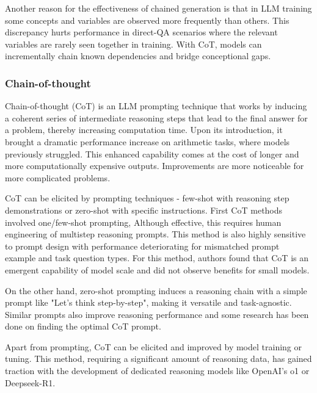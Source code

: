 Another reason for the effectiveness of chained generation is that in LLM training
some concepts and variables are observed more frequently than others\cite{prystawski2023thinkstepstepreasoning}. 
This discrepancy hurts performance in direct-QA scenarios where the relevant
variables are rarely seen together in training. With CoT, models can incrementally chain known dependencies and bridge conceptional gaps.

\subsubsection{Chain-of-thought}\label{sec:cot}
Chain-of-thought\cite{wei2023chainofthoughtpromptingelicitsreasoning} (CoT) is an LLM prompting technique that works by inducing a coherent series of intermediate 
reasoning steps that lead to the final answer for a problem, thereby increasing computation time. 
Upon its introduction, it brought a dramatic performance increase on arithmetic tasks, where models previously struggled.
This enhanced capability comes at the cost of longer and more computationally expensive outputs\cite{brown2024largelanguagemonkeysscaling}. 
Improvements are more noticeable for more complicated problems\cite{wei2023chainofthoughtpromptingelicitsreasoning}. 

CoT can be elicited by prompting techniques - few-shot with reasoning step demonstrations or 
zero-shot with specific instructions\cite{wang2024chainofthoughtreasoningprompting}.
First CoT methods\cite{wei2023chainofthoughtpromptingelicitsreasoning} involved one/few-shot prompting, 
Although effective, this requires human engineering of multistep reasoning prompts.
This method is also highly sensitive to prompt design with performance deteriorating 
for mismatched prompt example and task question types\cite{NEURIPS2022_8bb0d291}.
For this method, authors found that CoT is an emergent capability of model scale 
and did not observe benefits for small models\cite{wei2023chainofthoughtpromptingelicitsreasoning}.

On the other hand, zero-shot prompting induces a reasoning chain with a simple prompt like "Let's think step-by-step",
making it versatile and task-agnostic\cite{NEURIPS2022_8bb0d291}. Similar prompts also improve reasoning performance and 
some research\cite{yang2024largelanguagemodelsoptimizers} has been done on finding the optimal CoT prompt.

Apart from prompting, CoT can be elicited and improved by model training or tuning. 
This method, requiring a significant amount of reasoning data\cite{wang2024chainofthoughtreasoningprompting},
has gained traction with the development of dedicated reasoning models like OpenAI's o1\cite{openai2024openaio1card} or Deepseek-R1\cite{deepseekai2025deepseekr1incentivizingreasoningcapability}.

